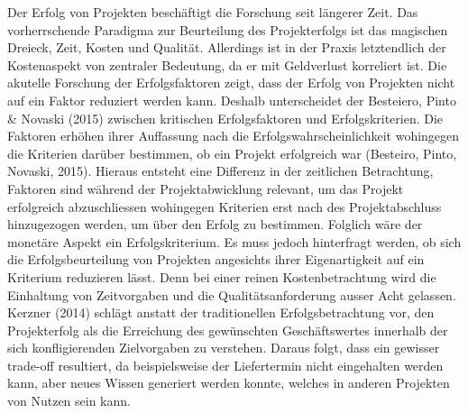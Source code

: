 \newline
Der Erfolg von Projekten beschäftigt die Forschung seit längerer Zeit. Das vorherrschende Paradigma zur Beurteilung des Projekterfolgs ist das magischen Dreieck, Zeit, Kosten und Qualität. Allerdings ist in der Praxis letztendlich der Kostenaspekt von zentraler Bedeutung, da er mit Geldverlust korreliert ist. Die akutelle Forschung der Erfolgsfaktoren zeigt, dass der Erfolg von Projekten nicht auf ein Faktor reduziert werden kann. Deshalb unterscheidet der Besteiero, Pinto \& Novaski (2015) zwischen kritischen Erfolgsfaktoren und Erfolgskriterien. Die Faktoren erhöhen ihrer Auffassung nach die Erfolgswahrscheinlichkeit wohingegen die Kriterien darüber bestimmen, ob ein Projekt erfolgreich war (Besteiro, Pinto, Novaski, 2015). Hieraus entsteht eine Differenz in der zeitlichen Betrachtung, Faktoren sind während der Projektabwicklung relevant, um das Projekt erfolgreich abzuschliessen wohingegen Kriterien erst nach des Projektabschluss hinzugezogen werden, um über den Erfolg zu bestimmen. Folglich wäre der monetäre Aspekt ein Erfolgskriterium. Es muss jedoch hinterfragt werden, ob sich die Erfolgsbeurteilung von Projekten angesichts ihrer Eigenartigkeit auf ein Kriterium reduzieren lässt.  Denn bei einer reinen Kostenbetrachtung wird die Einhaltung von Zeitvorgaben und die Qualitätsanforderung ausser Acht gelassen. Kerzner (2014) schlägt anstatt der traditionellen Erfolgsbetrachtung vor, den Projekterfolg als die Erreichung des gewünschten Geschäftswertes innerhalb der sich konfligierenden Zielvorgaben zu verstehen. Daraus folgt, dass ein gewisser trade-off resultiert, da beispielsweise der Liefertermin nicht eingehalten werden kann, aber neues Wissen generiert werden konnte, welches in anderen Projekten von Nutzen sein kann. 
\newline

